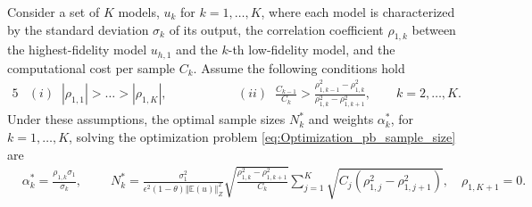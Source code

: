 %
\begin{theorem}
\label{thm:Sample_size_est}
Consider a set of $K$ models, $u_k$ for $k=1,\ldots,K$, where each model is characterized by the standard deviation $\sigma_k$ of its output, the correlation coefficient $\rho_{1,k}$ between the highest-fidelity model $u_{h,1}$ and the $k$-th low-fidelity model, and the computational cost per sample $C_k$. Assume the following conditions hold
%
\begin{alignat*}{5}
    &(i)\;\; |\rho_{1,1}|>\ldots>|\rho_{1,K}|,& \qquad \qquad
    &(ii)\;\; \frac{C_{k-1}}{C_k}>\frac{\rho_{1,k-1}^2-\rho_{1,k}^2}{\rho_{1,k}^2-\rho_{1,k+1}^2},\quad \quad k=2,\ldots,K.
\end{alignat*}
%
Under these assumptions, the optimal sample sizes $N_k^*$ and weights $\alpha_k^*$, for $k=1,\ldots, K$, solving the optimization problem \eqref{eq:Optimization_pb_sample_size} are
%
\begin{align}
    \label{eq:MFMC_SampleSize}
    &\alpha_k^*=\frac{\rho_{1,k}\sigma_1}{\sigma_k},\qquad \;N_k^*=\frac{\sigma_1^2}{\epsilon^2(1-\theta)\left\Vert\mathbb{E}(u) \right\Vert_{Z}^2}\sqrt{\frac{\rho_{1,k}^2-\rho_{1,k+1}^2}{C_k}}\sum_{j=1}^K\sqrt{C_j\left(\rho_{1,j}^2-\rho_{1,j+1}^2\right)}, \quad \rho_{1,K+1}=0.
\end{align}
%
\end{theorem}
%

